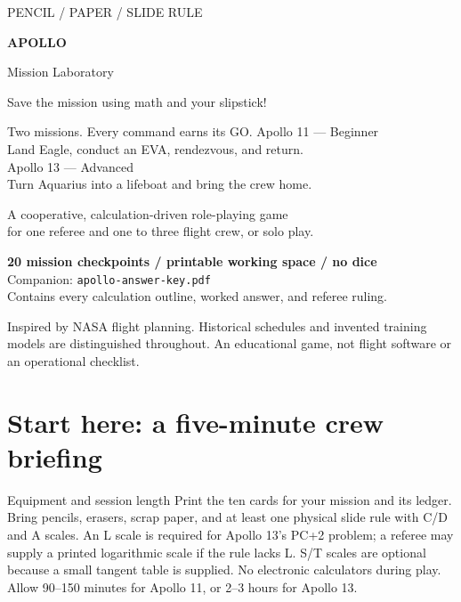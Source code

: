 \documentclass[11pt]{article}
\begin{document}
\begin{titlepage}
\centering
\vspace*{0.08in}
{\large\textsf{PENCIL \quad / \quad PAPER \quad / \quad SLIDE RULE}\par}
\vspace{0.16in}
{\fontsize{38}{42}\selectfont\bfseries\sffamily APOLLO\par}
\vspace{0.08in}
{\Huge\sffamily Mission Laboratory\par}
\vspace{0.12in}
\resizebox{0.92\linewidth}{!}{\ApolloCoverArt}\par
{\scriptsize Save the mission using math and your slipstick!\par}
\vspace{0.08in}
\begin{panel}{Two missions. Every command earns its GO.}
\centering
\large Apollo 11 --- Beginner\\[3pt]
\normalsize Land Eagle, conduct an EVA, rendezvous, and return.\\[8pt]
\large Apollo 13 --- Advanced\\[3pt]
\normalsize Turn Aquarius into a lifeboat and bring the crew home.
\end{panel}
\vspace{0.05in}
{\normalsize A cooperative, calculation-driven role-playing game\\
for one referee and one to three flight crew, or solo play.\par}
\vfill
\textbf{20 mission checkpoints / printable working space / no dice}\\[12pt]
Companion: \texttt{apollo-answer-key.pdf}\\
Contains every calculation outline, worked answer, and referee ruling.
\vspace{0.04in}

{\small Inspired by NASA flight planning. Historical schedules and
invented training models are distinguished throughout.
An educational game, not flight software or an operational checklist.}
\end{titlepage}

\section*{Start here: a five-minute crew briefing}
\begin{panel}{Equipment and session length}
Print the ten cards for your mission and its ledger. Bring pencils,
erasers, scrap paper, and at least one physical slide rule with C/D and
A scales. An L scale is required for Apollo 13's PC+2 problem; a referee
may supply a printed logarithmic scale if the rule lacks L.
S/T scales are optional because a small tangent table is supplied.
No electronic calculators during play.
Allow 90--150 minutes for Apollo 11, or 2--3 hours for Apollo 13.
\end{panel}
\end{document}
